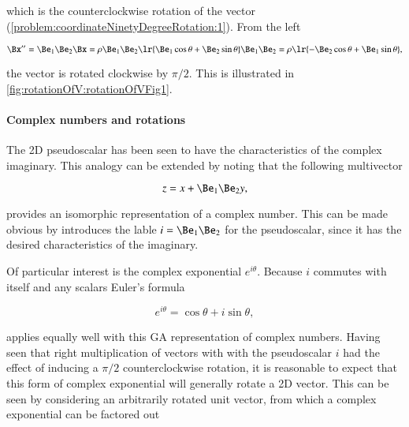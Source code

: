 which is the counterclockwise rotation of the vector (\cref{problem:coordinateNinetyDegreeRotation:1}).
From the left

\begin{dmath}\label{eqn:SimpleProducts2:310}
\Bx''
= \Be_1 \Be_2 \Bx
= \rho \Be_1 \Be_2 \lr{ \Be_1 \cos\theta + \Be_2 \sin\theta } \Be_1 \Be_2
= \rho \lr{ -\Be_2 \cos\theta + \Be_1 \sin\theta },
\end{dmath}

the vector is rotated clockwise by \( \pi/2 \).
%
This is illustrated in \cref{fig:rotationOfV:rotationOfVFig1}.

\paragraph{Complex numbers and rotations}

The 2D pseudoscalar has been seen to have the characteristics of the complex imaginary.
This analogy can be extended by noting that the following multivector

\begin{dmath}\label{eqn:SimpleProducts2:320}
z = x + \Be_1 \Be_2 y,
\end{dmath}

provides an isomorphic representation of a complex number.
This can be made obvious by introduces the lable \( i = \Be_1 \Be_2 \) for the pseudoscalar, since it has the desired characteristics of the imaginary.

Of particular interest is the complex exponential \( e^{i \theta} \).
Because \( i \) commutes with itself and any scalars Euler's formula

\begin{dmath}\label{eqn:SimpleProducts2:340}
e^{i \theta} = \cos\theta + i \sin\theta,
\end{dmath}

applies equally well with this GA representation of complex numbers.
Having seen that right multiplication of vectors with with the pseudoscalar \( i \) had the effect of inducing a \( \pi/2 \) counterclockwise rotation, it is reasonable to expect that this form of complex exponential will generally rotate a 2D vector.
This can be seen by considering an arbitrarily rotated unit vector, from which a complex exponential can be factored out

